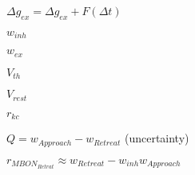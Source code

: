 $\Delta g_{ex} = \Delta g_{ex} + F(\Delta t)$

$w_{inh}$

$w_{ex}$

$V_{th}$

$V_{rest}$

$r_{kc}$

$Q = w_{Approach} - w_{Retreat}$ (uncertainty)


$r_{MBON_{Retrat}} \approx w_{Retreat} - w_{inh} w_{Approach} $